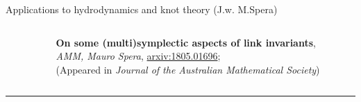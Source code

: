 \documentclass[handout,10pt]{beamer}
\newcommand{\extrarule}{
		{
			\color{UniGreen}
			\par\hspace*{-\dimexpr0.5\paperwidth-0.5\textwidth}\rule[0.5\baselineskip]{\paperwidth}{0.4pt}
			\vspace{-2em}
		}
}
\begin{document}
	\begin{frame}[t]{Applications to hydrodynamics and knot theory \small(J.w. M.Spera)}

		\begin{columns}
			\begin{column}[T]{0.2\textwidth}
				\centering
			\end{column}		
			\begin{column}[T]{0.8\textwidth}
				\vspace{-.25em}
				\begin{center}
					\textbf{On some (multi)symplectic aspects of link invariants}, \\ 
					\emph{AMM, Mauro Spera}, \href{https://arXiv.org/abs/1805.01696}{arxiv:1805.01696};\\
					(Appeared in \emph{Journal of the Australian Mathematical Society})	
				\end{center}			
			\end{column}		
		\end{columns}	
		\extrarule
	

\end{frame}
\end{document}
